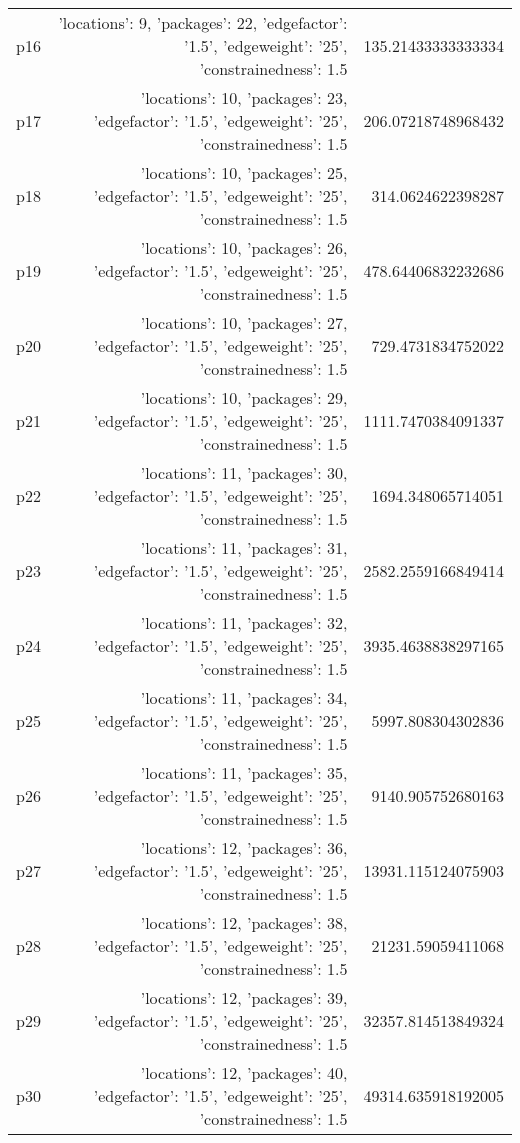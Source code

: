\documentclass{article}
\begin{document}
\begin{center}
\begin{tabular}{r|r|r}
  p16&{'locations': 9, 'packages': 22, 'edgefactor': '1.5', 'edgeweight': '25', 'constrainedness': 1.5}&135.21433333333334\\
  p17&{'locations': 10, 'packages': 23, 'edgefactor': '1.5', 'edgeweight': '25', 'constrainedness': 1.5}&206.07218748968432\\
  p18&{'locations': 10, 'packages': 25, 'edgefactor': '1.5', 'edgeweight': '25', 'constrainedness': 1.5}&314.0624622398287\\
  p19&{'locations': 10, 'packages': 26, 'edgefactor': '1.5', 'edgeweight': '25', 'constrainedness': 1.5}&478.64406832232686\\
  p20&{'locations': 10, 'packages': 27, 'edgefactor': '1.5', 'edgeweight': '25', 'constrainedness': 1.5}&729.4731834752022\\
  p21&{'locations': 10, 'packages': 29, 'edgefactor': '1.5', 'edgeweight': '25', 'constrainedness': 1.5}&1111.7470384091337\\
  p22&{'locations': 11, 'packages': 30, 'edgefactor': '1.5', 'edgeweight': '25', 'constrainedness': 1.5}&1694.348065714051\\
  p23&{'locations': 11, 'packages': 31, 'edgefactor': '1.5', 'edgeweight': '25', 'constrainedness': 1.5}&2582.2559166849414\\
  p24&{'locations': 11, 'packages': 32, 'edgefactor': '1.5', 'edgeweight': '25', 'constrainedness': 1.5}&3935.4638838297165\\
  p25&{'locations': 11, 'packages': 34, 'edgefactor': '1.5', 'edgeweight': '25', 'constrainedness': 1.5}&5997.808304302836\\
  p26&{'locations': 11, 'packages': 35, 'edgefactor': '1.5', 'edgeweight': '25', 'constrainedness': 1.5}&9140.905752680163\\
  p27&{'locations': 12, 'packages': 36, 'edgefactor': '1.5', 'edgeweight': '25', 'constrainedness': 1.5}&13931.115124075903\\
  p28&{'locations': 12, 'packages': 38, 'edgefactor': '1.5', 'edgeweight': '25', 'constrainedness': 1.5}&21231.59059411068\\
  p29&{'locations': 12, 'packages': 39, 'edgefactor': '1.5', 'edgeweight': '25', 'constrainedness': 1.5}&32357.814513849324\\
  p30&{'locations': 12, 'packages': 40, 'edgefactor': '1.5', 'edgeweight': '25', 'constrainedness': 1.5}&49314.635918192005
                            \end{tabular}
                            \end{center}
                    
\end{document}
